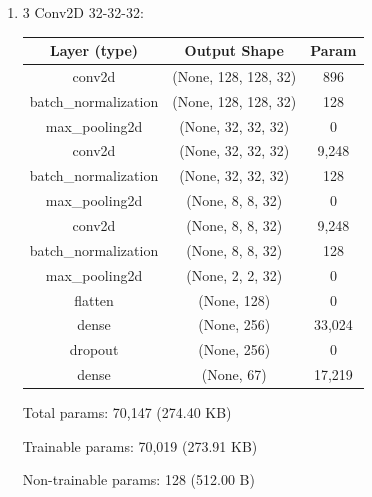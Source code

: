 \documentclass{article}
\begin{document}
\begin{enumerate}
        
        \newpage
        \item 3 Conv2D 32-32-32:
            \begin{table}[h!]
                \centering
                \begin{tabular}{| c | c | c |}
                    \hline
                    Layer (type) & Output Shape & Param \\
                    \hline
                    conv2d & (None, 128, 128, 32) & 896 \\
                    \hline
                    batch\_normalization & (None, 128, 128, 32) & 128 \\
                    \hline
                    max\_pooling2d & (None, 32, 32, 32) & 0 \\
                    \hline
                    conv2d & (None, 32, 32, 32) & 9,248 \\
                    \hline
                    batch\_normalization & (None, 32, 32, 32) & 128 \\
                    \hline
                    max\_pooling2d & (None, 8, 8, 32) & 0 \\
                    \hline
                    conv2d & (None, 8, 8, 32) & 9,248 \\
                    \hline
                    batch\_normalization & (None, 8, 8, 32) & 128 \\
                    \hline
                    max\_pooling2d & (None, 2, 2, 32) & 0 \\
                    \hline
                    flatten & (None, 128) & 0 \\
                    \hline
                    dense & (None, 256) & 33,024 \\
                    \hline
                    dropout & (None, 256) & 0 \\
                    \hline
                    dense & (None, 67) & 17,219 \\
                    \hline
                \end{tabular}
            \end{table}
        
            Total params: 70,147 (274.40 KB)
        
            Trainable params: 70,019 (273.91 KB)
        
            Non-trainable params: 128 (512.00 B)
    

\end{enumerate}
\end{document}

